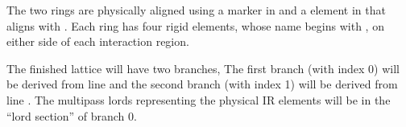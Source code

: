 The two rings are physically aligned using a marker  in 
and a  element  in  that aligns with
.  Each ring has four rigid  elements, whose name
begins with , on either side of each interaction region.

The finished lattice will have two branches, The first branch (with
index 0) will be derived from line  and the second branch (with
index 1) will be derived from line . The multipass lords
representing the physical IR elements will be in the ``lord section''
of branch 0. 
